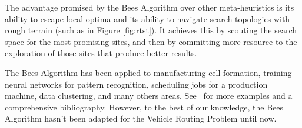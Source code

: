 The advantage promised by the Bees Algorithm over other meta-heuristics is its ability to escape local optima and its ability to navigate search topologies with rough terrain (such as in Figure \ref{fig:rtst}). It achieves this by scouting the search space for the most promising sites, and then by committing more resource to the exploration of those sites that produce better results.


The Bees Algorithm has been applied to manufacturing cell formation, training neural networks for pattern recognition, scheduling jobs for a production machine, data clustering, and many others areas. See~\cite{beesalg} for more examples and a comprehensive bibliography. However, to the best of our knowledge, the Bees Algorithm hasn't been adapted for the Vehicle Routing Problem until now.
